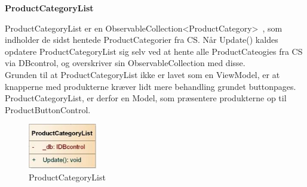 \textbf{ProductCategoryList}

ProductCategoryList er en ObservableCollection<ProductCategory>~\cite{ObsCol}, som indholder de sidst hentede ProductCategorier fra \gls{CS}. Når Update() kaldes opdatere ProductCategoryList sig selv ved at hente alle ProductCateogies fra \gls{CS} via DBcontrol, og overskriver sin ObservableCollection med disse.\\
Grunden til at ProductCategoryList ikke er lavet som en ViewModel, er at knapperne med produkterne kræver lidt mere behandling grundet buttonpages. ProductCategoryList, er derfor en Model, som præsentere produkterne op til ProductButtonControl.

\begin{figure}[H]
    \centering
    \includegraphics[width=30mm]{Systemdesign/Frontend/BLL/Pics/ProductCategoryList}
    \caption{ProductCategoryList}
    \label{fig:ProductCategoryList}
\end{figure}

\bigskip